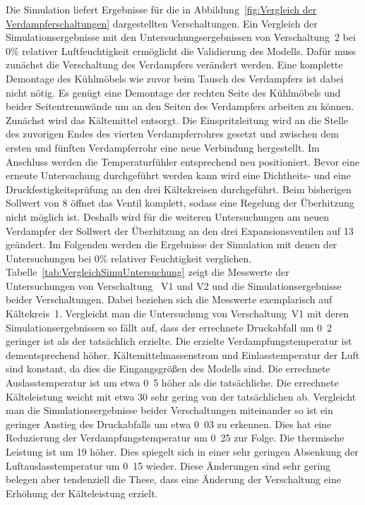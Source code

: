Die Simulation liefert Ergebnisse für die in Abbildung~\ref{fig:Vergleich der Verdampferschaltungen} dargestellten Verschaltungen. Ein Vergleich der Simulationsergebnisse mit den Untersuchungsergebnissen von Verschaltung~2 bei \unit{0}{\%} relativer Luftfeuchtigkeit ermöglicht die Validierung des Modells. Dafür muss zunächst die Verschaltung des Verdampfers verändert werden. Eine komplette Demontage des Kühlmöbels wie zuvor beim Tausch des Verdampfers ist dabei nicht nötig. Es genügt eine Demontage der rechten Seite des Kühlmöbels und beider Seitentrennwände um an den Seiten des Verdampfers arbeiten zu können. Zunächst wird das Kältemittel entsorgt. Die Einspritzleitung wird an die Stelle des zuvorigen Endes des vierten Verdampferrohres gesetzt und zwischen dem ersten und fünften Verdampferrohr eine neue Verbindung hergestellt. Im Anschluss werden die Temperaturfühler entsprechend neu positioniert. Bevor eine erneute Untersuchung durchgeführt werden kann wird eine Dichtheits- und eine Druckfestigkeitsprüfung an den drei Kältekreisen durchgeführt. Beim bisherigen Sollwert von \unit{8}{\kelvin} öffnet das Ventil komplett, sodass eine Regelung der Überhitzung nicht möglich ist. Deshalb wird für die weiteren Untersuchungen am neuen Verdampfer der Sollwert der Überhitzung an den drei Expansionsventilen auf \unit{13}{\kelvin} geändert. \newline 
Im Folgenden werden die Ergebnisse der Simulation mit denen der Untersuchungen bei \unit{0}{\%} relativer Feuchtigkeit verglichen. Tabelle~\ref{tab:VergleichSimuUntersuchung} zeigt die Messwerte der Untersuchungen von Verschaltung~ V1 und V2 und die Simulationsergebnisse beider Verschaltungen. Dabei beziehen sich die Messwerte exemplarisch auf Kältekreis~1. 
Vergleicht man die Untersuchung von Verschaltung~V1 mit deren Simulationsergebnissen so fällt auf, dass der errechnete Druckabfall um \unit{0.2}{\bbar} geringer ist als der tatsächlich erzielte. Die erzielte Verdampfungstemperatur ist dementsprechend höher.
Kältemittelmassenstrom und Einlasstemperatur der Luft sind konstant, da dies die Eingangsgrößen des Modells sind. Die errechnete Auslasstemperatur ist um etwa \unit{0.5}{\kelvin} höher als die tatsächliche. Die errechnete Kälteleistung weicht mit etwa \unit{30}{\watt} sehr gering von der tatsächlichen ab.  \newline Vergleicht man die Simulationsergebnisse beider Verschaltungen miteinander so ist ein geringer Anstieg des Druckabfalls um etwa \unit{0.03}{\bbar} zu erkennen. Dies hat eine Reduzierung der Verdampfungstemperatur um \unit{0.25}{\kelvin} zur Folge. Die thermische Leistung ist um \unit{19}{\watt} höher. Dies spiegelt sich in einer sehr geringen Absenkung der Luftauslasstemperatur um \unit{0.15}{\kelvin} wieder. Diese Änderungen sind sehr gering belegen aber tendenziell die These, dass eine Änderung der Verschaltung eine Erhöhung der Kälteleistung erzielt. \newline

